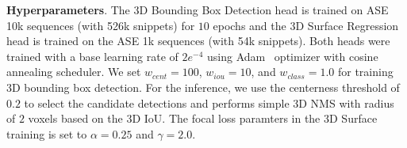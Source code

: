 \noindent\textbf{Hyperparameters}. The 3D Bounding Box Detection head is trained on ASE 10k sequences (with 526k snippets) for $10$ epochs and the 3D Surface Regression head is trained on the ASE 1k sequences (with 54k snippets). Both heads were trained with a base learning rate of $2e^{-4}$ using Adam~\cite{kingma2014adam} optimizer with cosine annealing scheduler. We set $w_{cent}=100$, $w_{iou} = 10$, and $w_{class} = 1.0$ for training 3D bounding box detection. For the inference, we use the centerness threshold of $0.2$ to select the candidate detections and performs simple 3D NMS with radius of $2$ voxels based on the 3D IoU. The focal loss paramters in the 3D Surface training is set to $\alpha=0.25$ and $\gamma=2.0$.

% 
